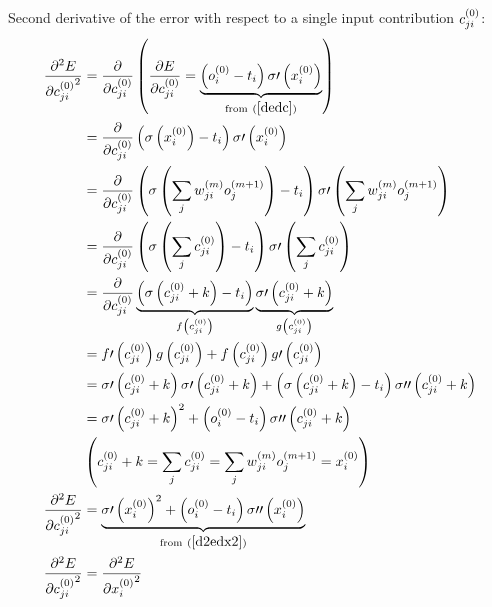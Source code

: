 Second derivative of the error with respect to a single input contribution $c_{ji}^{(0)}$:
\begin{align}
\pdv[2]{E}{{c_{ji}^{(0)}}} &=
\pdv{}{c_{ji}^{(0)}} 
\left(\pdv{E}{c_{ji}^{(0)}} = 
\underbrace{\left(o_{i}^{(0)} - t_{i} \right) \sigma\prime\left(x_{i}^{(0)}\right)}
_{\text{from} \ (\ref{dedc})}
\right)
\\
&=\pdv{}{c_{ji}^{(0)}}\left(\sigma\left(x_{i}^{(0)}\right) - t_{i} \right) \sigma\prime\left(x_{i}^{(0)}\right)
\\
&=\pdv{}{c_{ji}^{(0)}}\left(\sigma\left(\sum\limits_j {w_{ji}^{(m)}}{ o_{j}^{(m + 1)}}\right) - t_{i} \right) \sigma\prime\left(\sum\limits_j {w_{ji}^{(m)}}{ o_{j}^{(m + 1)}}\right)
\\
&=\pdv{}{c_{ji}^{(0)}}\left(\sigma\left(\sum\limits_j {c_{ji}^{(0)}}\right) - t_{i} \right) \sigma\prime\left(\sum\limits_j {c_{ji}^{(0)}}\right)
\\
&=\pdv{}{c_{ji}^{(0)}}
\underbrace{\left(\sigma\left({c_{ji}^{(0)}} + k\right) - t_{i} \right)}
_{f\left(c_{ji}^{(0)}\right)}
\underbrace{\sigma\prime\left({c_{ji}^{(0)}} + k\right)}
_{g\left(c_{ji}^{(0)}\right)}
\\
&=f\prime\left(c_{ji}^{(0)}\right)g\left(c_{ji}^{(0)}\right) + f\left(c_{ji}^{(0)}\right)g\prime\left(c_{ji}^{(0)}\right)
\\
&=\sigma\prime\left({c_{ji}^{(0)}} + k\right)\sigma\prime\left({c_{ji}^{(0)}} + k\right) + 
\left(\sigma\left({c_{ji}^{(0)}} + k\right) - t_{i} \right)\sigma\prime\prime\left({c_{ji}^{(0)}} + k\right)
\\
&=\sigma\prime\left({c_{ji}^{(0)}} + k\right)^2 + 
\left(o_{i}^{(0)} - t_{i} \right)\sigma\prime\prime\left({c_{ji}^{(0)}} + k\right)
\\
&\left(c_{ji}^{(0)} + k = \sum_j{c_{ji}^{(0)}} = \sum\limits_j {w_{ji}^{(m)}}{ o_{j}^{(m + 1)}} = x_{i}^{(0)} \right)
\\
\pdv[2]{E}{{c_{ji}^{(0)}}}&=
\underbrace{\sigma\prime\left(x_{i}^{(0)}\right)^2 + 
\left(o_{i}^{(0)} - t_{i} \right)\sigma\prime\prime\left(x_{i}^{(0)}\right)}
_{\text{from} \ (\ref{d2edx2})}
\\
\pdv[2]{E}{{c_{ji}^{(0)}}} &= \pdv[2]{E}{{x_{i}^{(0)}}}
\end{align}


